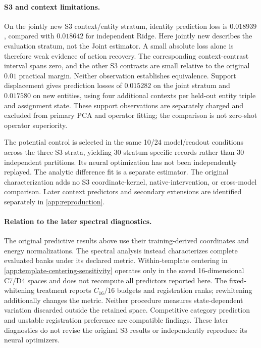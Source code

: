 \paragraph{S3 and context limitations.}
On the jointly new S3 context/entity stratum, identity
prediction loss is $0.018939$, compared with $0.018642$
for independent Ridge.
Here jointly new describes the evaluation stratum,
not the Joint estimator.
A small absolute loss alone is therefore weak evidence
of action recovery.
The corresponding context-contrast interval spans zero,
and the other S3 contrasts are small relative to the
original $0.01$ practical margin.
Neither observation establishes equivalence.
Support displacement gives prediction losses of
$0.015282$ on the joint stratum and $0.017580$ on new
entities, using four additional contexts per held-out
entity triple and assignment state.
These support observations are separately charged and
excluded from primary PCA and operator fitting;
the comparison is not zero-shot operator superiority.

The potential control is selected in the same 10/24
model/readout conditions across the three S3 strata,
yielding 30 stratum-specific records rather than
30 independent partitions.
Its neural optimization has not been independently
replayed.
The analytic difference fit is a separate estimator.
The original characterization adds no S3 coordinate-kernel,
native-intervention, or cross-model comparison.
Later context predictors and secondary extensions are
identified separately in \cref{app:reproduction}.

\paragraph{Relation to the later spectral diagnostics.}
The original predictive results above use their
training-derived coordinates and energy normalizations.
The spectral analysis instead characterizes complete
evaluated banks under its declared metric.
Within-template centering in
\cref{app:template-centering-sensitivity} operates only
in the saved 16-dimensional C7/D4 spaces and does not
recompute all predictors reported here.
The fixed-whitening treatment reports $C_{16}/16$
budgets and registration ranks; rewhitening additionally
changes the metric.
Neither procedure measures state-dependent variation
discarded outside the retained space.
Competitive category prediction and unstable registration
preference are compatible findings.
These later diagnostics do not revise the original S3
results or independently reproduce its neural optimizers.

